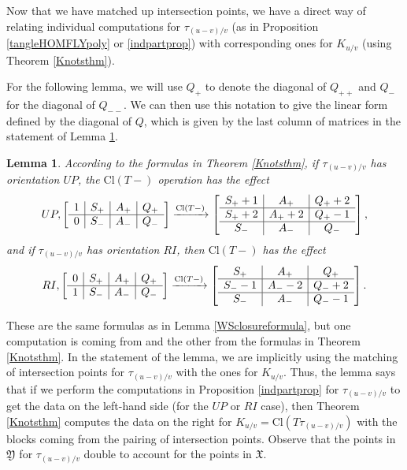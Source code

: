 \documentclass[11pt]{amsart}
\theoremstyle{plain}
\newtheorem{lemmaN}[theoremN]{Lemma}
\theoremstyle{definition}
\theoremstyle{remark}
\begin{document}
Now that we have matched up intersection points, we have a direct way of relating individual computations for $\tau_{(u-v)/v}$ (as in Proposition \ref{tangleHOMFLYpoly} or \ref{indpartprop}) with corresponding ones for $K_{u/v}$ (using Theorem \ref{Knotsthm}).

For the following lemma, we will use $Q_+$ to denote the diagonal of $Q_{++}$ and $Q_-$ for the diagonal of $Q_{--}$. We can then use this notation to give the linear form defined by the diagonal of $Q$, which is given by the last column of matrices in the statement of Lemma \ref{knotslinforms}.

\begin{lemmaN}
\label{knotslinforms}
    According to the formulas in Theorem \ref{Knotsthm}, if $\tau_{(u-v)/v}$ has orientation $UP$, the $\text{Cl}(T-)$ operation has the effect
\[
    UP, \left[\begin{array}{ c| c | c | c }
    1 & S_+ & A_+ & Q_+ \\
    \hline
    0 & S_- & A_- & Q_-
  \end{array}\right]
    \xrightarrow{\text{Cl}(T-)} 
    \left[\begin{array}{ c | c | c }
    S_++1 & A_+ & Q_++2 \\
    \hline
    S_++2 & A_+ +2 & Q_+-1\\
    \hline
    S_- & A_- & Q_-
  \end{array}\right],
\]
    and if $\tau_{(u-v)/v}$ has orientation $RI$, then $\text{Cl}(T-)$ has the effect
\[
     RI, \left[\begin{array}{ c| c | c | c }
    0 & S_+ & A_+ & Q_+ \\
    \hline
    1 & S_- & A_- & Q_- 
  \end{array}\right]
    \xrightarrow{\text{Cl}(T-)}
    \left[\begin{array}{ c | c | c }
    S_+  & A_+ & Q_+ \\
    \hline
    S_- -1 & A_- -2 & Q_-+2\\
    \hline
    S_-  & A_- & Q_--1
  \end{array}\right].
  \]
\end{lemmaN}

These are the same formulas as in Lemma \ref{WSclosureformula}, but one computation is coming from \cite{JHpI26} and the other from the formulas in Theorem \ref{Knotsthm}. In the statement of the lemma, we are implicitly using the matching of intersection points for $\tau_{(u-v)/v}$ with the ones for $K_{u/v}$. Thus, the lemma says that if we perform the computations in Proposition \ref{indpartprop} for $\tau_{(u-v)/v}$ to get the data on the left-hand side (for the $UP$ or $RI$ case), then Theorem \ref{Knotsthm} computes the data on the right for $K_{u/v}=\text{Cl}(T\tau_{(u-v)/v})$ with the blocks coming from the pairing of intersection points. Observe that the points in $\mathfrak{Y}$ for $\tau_{(u-v)/v}$ double to account for the points in $\mathfrak{X}$.
\end{document}
